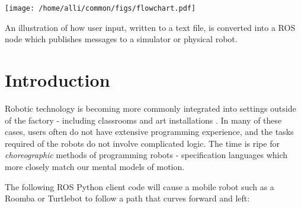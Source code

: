 \documentclass[sigchi-a]{acmart}
\begin{document}
%
%



\maketitle

\begin{marginfigure}
\centering
\texttt{[image: /home/alli/common/figs/flowchart.pdf]}
\caption{An illustration of how user input, written to a text file, is
converted into a ROS node which publishes messages to a simulator or physical 
robot.
\label{flowchart}}

\vspace{2em}
\end{marginfigure}



\section{Introduction}\label{introduction}

Robotic technology is becoming more commonly integrated into settings outside of
the factory - including classrooms \cite{mataric2004robotics} and art installations
\cite{kukaDance2017}. In many of these
cases, users often do not have extensive programming experience, and the tasks
required of the robots do not involve complicated logic. The time is ripe for
\emph{choreographic} methods of programming robots - specification languages
which more closely match our mental models of motion.


\begin{sidebar}
The following ROS Python client code will cause a
mobile robot such as a Roomba or Turtlebot to follow a path that curves
forward and left:
\end{sidebar}

\newcommand*{\MyIndent}{\hspace*{0.5cm}}
\end{document}
